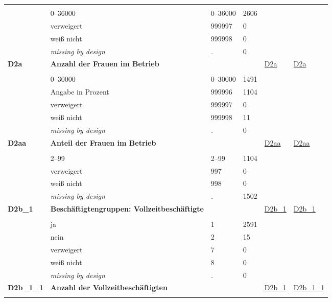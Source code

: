 \begin{longtable}{| L{2.45cm} | L{6cm} | C{1.5cm} | R{1cm} | C{2.25cm} | C{2.25cm} |}
   &  &  &  &  &  \\ 
   & 0--36000 & 0--36000 & 2606 &  &  \\ 
   & verweigert & 999997 & 0 &  &  \\ 
   & weiß nicht & 999998 & 0 &  &  \\ 
   & \textit{missing by design} & \textit{.} & 0 &  &  \\ 
   \midrule
\textbf{D2a}\label{var:D2a} & \textbf{Anzahl der Frauen im Betrieb} &  &  & \hyperref[D2a]{D2a} & \hyperref[var:suf:D2a]{D2a} \\ 
   &  &  &  &  &  \\ 
   & 0--30000 & 0--30000 & 1491 &  &  \\ 
   & Angabe in Prozent & 999996 & 1104 &  &  \\ 
   & verweigert & 999997 & 0 &  &  \\ 
   & weiß nicht & 999998 & 11 &  &  \\ 
   & \textit{missing by design} & \textit{.} & 0 &  &  \\ 
   \midrule
\textbf{D2aa}\label{var:D2aa} & \textbf{Anteil der Frauen im Betrieb} &  &  & \hyperref[D2aa]{D2aa} & \hyperref[var:suf:D2aa]{D2aa} \\ 
   &  &  &  &  &  \\ 
   & 2--99 & 2--99 & 1104 &  &  \\ 
   & verweigert & 997 & 0 &  &  \\ 
   & weiß nicht & 998 & 0 &  &  \\ 
   & \textit{missing by design} & \textit{.} & 1502 &  &  \\ 
   \midrule
\textbf{D2b\_1}\label{var:D2b:1} & \textbf{Beschäftigtengruppen: Vollzeitbeschäftigte} &  &  & \hyperref[D2b:1]{D2b\_1} & \hyperref[var:suf:D2b:1]{D2b\_1} \\ 
   &  &  &  &  &  \\ 
   & ja & 1 & 2591 &  &  \\ 
   & nein & 2 & 15 &  &  \\ 
   & verweigert & 7 & 0 &  &  \\ 
   & weiß nicht & 8 & 0 &  &  \\ 
   & \textit{missing by design} & \textit{.} & 0 &  &  \\ 
   \midrule
\textbf{D2b\_1\_1}\label{var:D2b:1:1} & \textbf{Anzahl der Vollzeitbeschäftigten} &  &  & \hyperref[D2b:1]{D2b\_1} & \hyperref[var:suf:D2b:1:1]{D2b\_1\_1} \\ 
   &  &  &  &  &  \\ 

\end{longtable}
